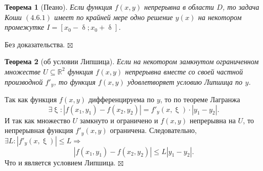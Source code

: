 \documentclass[a4paper, 12pt]{report}
\newenvironment{Proof} %
{\par\noindent{$\blacklozenge$}} %
{\hfill$\scriptstyle\boxtimes$}
\newcommand{\Rm}{\mathbb{R}}
\renewcommand{\leq}{\leqslant}
\renewcommand{\delta}{\updelta}
\renewcommand{\xi}{\upxi}
\newtheorem*{theorem}{Теорема}
\begin{document}
\begin{theorem}
	[Пеано]
	Если функция $f(x,y)$ непрерывна в области $D$, то задача Коши $(4.6.1)$ имеет по крайней мере одно решение $y(x)$ на некотором промежутке $I = [ x_0 - \delta; x_0 + \delta]$.
\end{theorem}
\begin{Proof}
	Без доказательства.
\end{Proof}
\begin{theorem}
	[об условии Липшица]
	Если на некотором замкнутом ограниченном множестве $U\subseteq \Rm^2$ функция $f(x,y)$ непрерывна вместе со своей частной производной $f'_y$, то функция $f(x,y)$ удовлетворяет условию Липшица по $y$.
\end{theorem}
\begin{Proof}
		Так как функция $f(x,y)$ дифференцируема по $y$, то по теореме Лагранжа $$\exists \xi: |f(x_1,y_1) - f(x_2,y_2)| = f'_y(x,\xi)\cdot |y_1 - y_2|.$$ И так как множество $U$ замкнуто и ограничено и $f(x,y)$ непрерывна на $U$, то непрерывная функция $f'_y(x,y)$ ограничена. Следовательно, $\exists L : |f'_y(x,\xi)| \leq L \Rightarrow$ $$|f(x_1,y_1) - f(x_2,y_2)| \leq L|y_1 - y_2|.$$
		Что и является условием Липшица.
\end{Proof}
\end{document}
